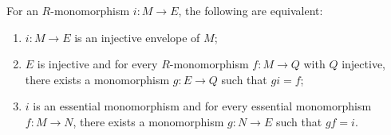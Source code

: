 For an $R$-monomorphism $i: M \to E$, the following are equivalent:
\begin{enumerate}
\item[(a)] $i: M \to E$ is an injective envelope of $M$;
\item[(b)] $E$ is injective and for every $R$-monomorphism $f: M \to Q$ with $Q$ injective, there exists a monomorphism $g: E \to Q$ such that $g i = f$;
\item[(c)] $i$ is an essential monomorphism and for every essential monomorphism $f: M \to N$, there exists a monomorphism $g: N \to E$ such that $g f = i$.
\end{enumerate}
